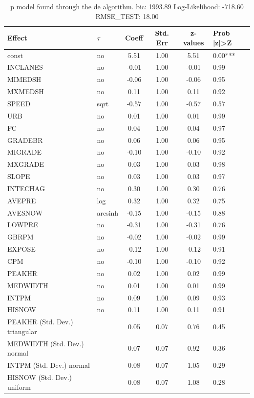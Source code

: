 \begin{table}
	\caption{p model found through the de algorithm. bic: 1993.89 Log-Likelihood: -718.60 RMSE_TEST: 18.00}
	\begin{center}
		\begin{tabular}{|l|l|c|c|c|l|}
			\hline
			Effect & $\tau$ & Coeff & Std. Err & z-values & Prob |z|>Z \\
			\hline
			const & no & 5.51 & 1.00 & 5.51 & 0.00*** \\
			\hline
			INCLANES & no & -0.01 & 1.00 & -0.01 & 0.99 \\
			\hline
			MIMEDSH & no & -0.06 & 1.00 & -0.06 & 0.95 \\
			\hline
			MXMEDSH & no & 0.11 & 1.00 & 0.11 & 0.92 \\
			\hline
			SPEED & sqrt & -0.57 & 1.00 & -0.57 & 0.57 \\
			\hline
			URB & no & 0.01 & 1.00 & 0.01 & 0.99 \\
			\hline
			FC & no & 0.04 & 1.00 & 0.04 & 0.97 \\
			\hline
			GRADEBR & no & 0.06 & 1.00 & 0.06 & 0.95 \\
			\hline
			MIGRADE & no & -0.10 & 1.00 & -0.10 & 0.92 \\
			\hline
			MXGRADE & no & 0.03 & 1.00 & 0.03 & 0.98 \\
			\hline
			SLOPE & no & 0.03 & 1.00 & 0.03 & 0.97 \\
			\hline
			INTECHAG & no & 0.30 & 1.00 & 0.30 & 0.76 \\
			\hline
			AVEPRE & log & 0.32 & 1.00 & 0.32 & 0.75 \\
			\hline
			AVESNOW & arcsinh & -0.15 & 1.00 & -0.15 & 0.88 \\
			\hline
			LOWPRE & no & -0.31 & 1.00 & -0.31 & 0.76 \\
			\hline
			GBRPM & no & -0.02 & 1.00 & -0.02 & 0.99 \\
			\hline
			EXPOSE & no & -0.12 & 1.00 & -0.12 & 0.91 \\
			\hline
			CPM & no & -0.10 & 1.00 & -0.10 & 0.92 \\
			\hline
			PEAKHR & no & 0.02 & 1.00 & 0.02 & 0.99 \\
			\hline
			MEDWIDTH & no & 0.01 & 1.00 & 0.01 & 0.99 \\
			\hline
			INTPM & no & 0.09 & 1.00 & 0.09 & 0.93 \\
			\hline
			HISNOW & no & 0.11 & 1.00 & 0.11 & 0.91 \\
			\hline
			PEAKHR (Std. Dev.) triangular &  & 0.05 & 0.07 & 0.76 & 0.45 \\
			\hline
			MEDWIDTH (Std. Dev.) normal &  & 0.07 & 0.07 & 0.92 & 0.36 \\
			\hline
			INTPM (Std. Dev.) normal &  & 0.08 & 0.07 & 1.05 & 0.29 \\
			\hline
			HISNOW (Std. Dev.) uniform &  & 0.08 & 0.07 & 1.08 & 0.28 \\
			\hline
		\end{tabular}
	\end{center}
\end{table}